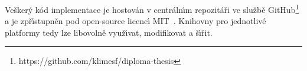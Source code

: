 Vešker\'y kód implementace je hostován v centráln\'{\i}m repozitáři
ve službě GitHub\footnote{https://github.com/klimesf/diploma-thesis}
a je zpř\'{\i}stupněn pod open-source licenc\'{\i} \gls{MIT}~\cite{mitlicense}.
Knihovny pro jednotlivé platformy tedy lze libovolně
využ\'{\i}vat, modifikovat a š\'{\i}řit.
